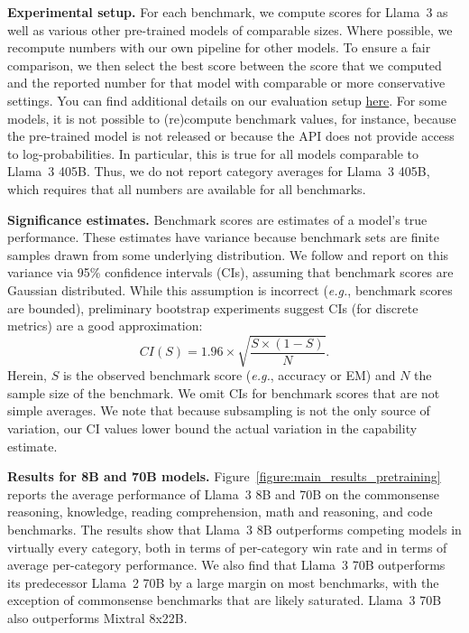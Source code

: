 \textbf{Experimental setup.} For each benchmark, we compute scores for Llama~3 as well as various other pre-trained models of comparable sizes. Where possible, we recompute numbers with our own pipeline for other models. To ensure a fair comparison, we then select the best score between the score that we computed and the reported number for that model with comparable or more conservative settings. You can find additional details on our evaluation setup \href{https://github.com/meta-llama/llama-models/blob/main/models/llama3_1/eval_details.md}{here}.
For some models, it is not possible to (re)compute benchmark values, for instance, because the pre-trained model is not released or because the API does not provide access to log-probabilities. In particular, this is true for all models comparable to Llama~3 405B. Thus, we do not report category averages for Llama~3 405B, which requires that all numbers are available for all benchmarks.

\textbf{Significance estimates.} Benchmark scores are estimates of a model's true performance. These estimates have variance because benchmark sets are finite samples drawn from some underlying distribution. We follow \citet{madaan2024quantifying} and report on this variance via 95\% confidence intervals (CIs), assuming that benchmark scores are Gaussian distributed. While this assumption is incorrect (\emph{e.g.}, benchmark scores are bounded), preliminary bootstrap experiments suggest CIs (for discrete metrics) are a good approximation: $$CI(S) = 1.96 \times \sqrt{\frac{S \times (1 - S)}{N}}.$$ Herein, $S$ is the observed benchmark score (\emph{e.g.}, accuracy or EM) and $N$ the sample size of the benchmark. We omit CIs for benchmark scores that are not simple averages. We note that because subsampling is not the only source of variation, our CI values lower bound the actual variation in the capability estimate.

\textbf{Results for 8B and 70B models.} 
Figure~\ref{figure:main_results_pretraining} reports the average performance of Llama~3 8B and 70B on the commonsense reasoning, knowledge, reading comprehension, math and reasoning, and code benchmarks. The results show that Llama~3 8B outperforms competing models in virtually every category, both in terms of per-category win rate and in terms of average per-category performance. We also find that Llama~3 70B outperforms its predecessor Llama~2 70B by a large margin on most benchmarks, with the exception of commonsense benchmarks that are likely saturated. Llama~3 70B also outperforms Mixtral 8x22B.

